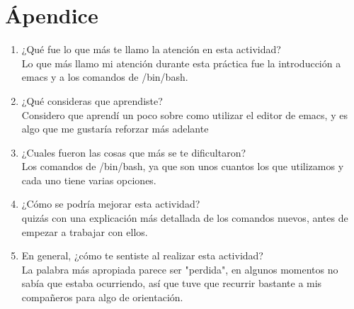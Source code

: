 \documentclass{article}
\begin{document}
\section{Ápendice}
\begin{enumerate}
\item ¿Qué fue lo que más te llamo la atención en esta actividad? \\ Lo que más llamo mi atención durante esta práctica fue la introducción a emacs y a los comandos de /bin/bash.
\item ¿Qué consideras que aprendiste? \\ Considero que aprendí un poco sobre como utilizar el editor de emacs, y es algo que me gustaría reforzar más adelante
\item ¿Cuales fueron las cosas que más se te dificultaron? \\ Los comandos de /bin/bash, ya que son unos cuantos los que utilizamos y cada uno tiene varias opciones.
\item ¿Cómo se podría mejorar esta actividad? \\ quizás con una explicación más detallada de los comandos nuevos, antes de empezar a trabajar con ellos.
\item En general, ¿cómo te sentiste al realizar esta actividad? \\ La palabra más apropiada parece ser "perdida", en algunos momentos no sabía que estaba ocurriendo, así que tuve que recurrir bastante a mis compañeros para algo de orientación.
\end{enumerate}
\end{document}
